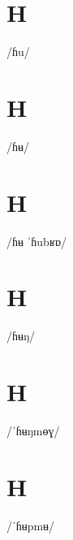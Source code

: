 \documentclass[10pt,a4paper,twoside]{book}
\begin{document}
\section*{H}

\begin{multicols}{3}
 {/ɦu/} {}
\end{multicols}

\section*{H}

\begin{multicols}{3}
 {/ɦʉ/} {}
\end{multicols}

\section*{H}

\begin{multicols}{3}
 {/ɦʉ ˈɦubʁɒ/} {}
\end{multicols}

\section*{H}

\begin{multicols}{3}
 {/ɦʉŋ/} {}
\end{multicols}

\section*{H}

\begin{multicols}{3}
 {/ˈɦʉŋmɵɣ/} {}
\end{multicols}

\section*{H}

\begin{multicols}{3}
 {/ˈɦʉpmʉ/} {}
\end{multicols}
\end{document}
